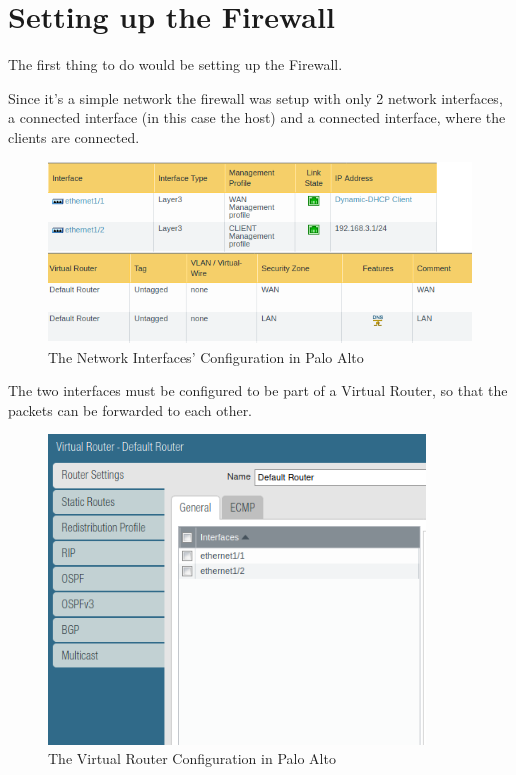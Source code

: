 \newpage

\section{Setting up the Firewall}

The first thing to do would be setting up the Firewall.

Since it's a simple network the firewall was setup with only 2 network interfaces, a  connected interface (in this case the host) and a  connected interface, where the clients are connected.

\begin{figure}[!hb]
 \centering
 \includegraphics[width=13cm]{img/network_config.png}
 \caption{The Network Interfaces' Configuration in Palo Alto }
 \label{Network Interfaces Configuration}
\end{figure}


The two interfaces must be configured to be part of a Virtual Router, so that the packets can be forwarded to each other.

\begin{figure}[!hb]
 \centering
 \includegraphics[width=10cm]{img/virtual_router.png}
 \caption{The Virtual Router Configuration in Palo Alto }
 \label{Virtual Router Configuration}
\end{figure}

